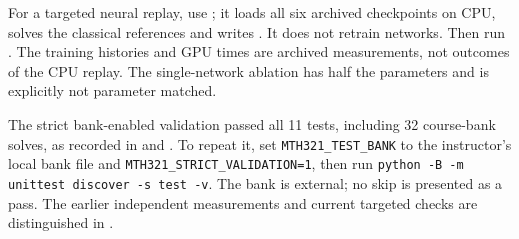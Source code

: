 For a targeted neural replay, use
; it loads all six archived
checkpoints on CPU, solves the classical references and writes
. It does not retrain
networks. Then run .
The training histories and GPU times are archived measurements, not outcomes
of the CPU replay. The single-network ablation has half the parameters and
is explicitly not parameter matched.

The strict bank-enabled validation passed all 11 tests, including 32
course-bank solves, as recorded in
 and
. To repeat it, set
\texttt{MTH321\_TEST\_BANK} to the instructor's local bank file and
\texttt{MTH321\_STRICT\_VALIDATION=1}, then run
\texttt{python -B -m unittest discover -s test -v}. The bank is external;
no skip is presented as a pass. The earlier independent measurements and
current targeted checks are distinguished in
.
